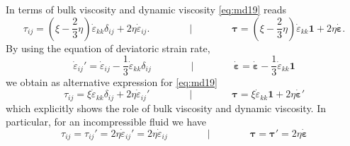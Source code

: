 In terms of bulk viscosity and dynamic viscosity \eqref{eq:md19} reads
\begin{equation}
\tau_{ij} = (\xi-\frac23 \eta) \dot\varepsilon_{kk} \delta_{ij} + 2\eta \dot\varepsilon_{ij}.
\qquad
\qquad
\bigg\rvert
\qquad
\qquad
{\bm \tau} = (\xi-\frac23 \eta) \dot\varepsilon_{kk} {\bm 1} + 2\eta \dot{\bm \varepsilon}.
\end{equation}
By using the equation of deviatoric strain rate,
\begin{equation}
\dot\varepsilon_{ij}' = \dot\varepsilon_{ij} -\frac13  \dot\varepsilon_{kk} \delta_{ij}
\qquad
\qquad
\bigg\rvert
\qquad
\qquad
\dot{\bm \varepsilon} = \dot{\bm \varepsilon} - \frac13 \dot\varepsilon_{kk} {\bm 1}
\end{equation}
we obtain as alternative expression for \eqref{eq:md19}
\begin{equation}
\tau_{ij} = \xi  \dot\varepsilon_{kk} \delta_{ij} + 2 \eta \dot\varepsilon_{ij}'
\qquad
\qquad
\bigg\rvert
\qquad
\qquad
{\bm \tau} = \xi \dot\varepsilon_{kk} {\bm 1} + 2 \eta \dot{\bm \varepsilon}'
\label{eq:md21}
\end{equation}
which explicitly shows the role of bulk viscosity and dynamic viscosity. In particular, for
an incompressible fluid we have
\begin{equation}
\tau_{ij}=\tau_{ij}'=2\eta \dot\varepsilon_{ij}' = 2 \eta \dot\varepsilon_{ij}
\qquad
\qquad
\bigg\rvert
\qquad
\qquad
{\bm \tau} = {\bm \tau}' = 2 \eta \dot{\bm \varepsilon}
\label{eq:md22}
\end{equation}


\vspace{0.5cm}
\vspace{0.5cm}







